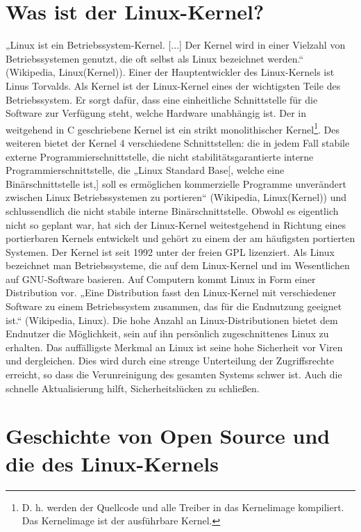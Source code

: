 \documentclass[a4paper,12pt]{article}
\begin{document}
\section{Was ist der Linux-Kernel?}%
„Linux ist ein Betriebssystem-Kernel. [...] Der Kernel wird in einer Vielzahl von Betriebssystemen genutzt, die oft selbst als Linux bezeichnet werden.“ (Wikipedia, Linux(Kernel)). Einer der Hauptentwickler des Linux-Kernels ist Linus Torvalds. Als Kernel ist der Linux-Kernel eines der wichtigsten Teile des Betriebssystem. Er sorgt dafür, dass eine einheitliche Schnittstelle für die Software zur Verfügung steht, welche Hardware unabhängig ist. Der in weitgehend in C geschriebene Kernel ist ein strikt monolithischer Kernel\footnote{D. h. werden der Quellcode und alle Treiber in das Kernelimage kompiliert. Das Kernelimage ist der ausführbare Kernel.}. Des weiteren bietet der Kernel 4 verschiedene Schnittstellen: die in jedem Fall stabile externe Programmierschnittstelle, die nicht stabilitätsgarantierte interne Programmierschnittstelle, die „Linux Standard Base[, welche eine Binärschnittstelle ist,] soll es ermöglichen kommerzielle Programme unverändert zwischen Linux Betriebssystemen zu portieren“ (Wikipedia, Linux(Kernel)) und schlussendlich die nicht stabile interne Binärschnittstelle. Obwohl es eigentlich nicht so geplant war, hat sich der Linux-Kernel weitestgehend in Richtung eines portierbaren Kernels entwickelt und gehört zu einem der am häufigsten portierten Systemen. Der Kernel ist seit 1992 unter der freien GPL lizenziert.
Als Linux bezeichnet man Betriebssysteme, die auf dem Linux-Kernel und im Wesentlichen auf GNU-Software basieren. Auf Computern kommt Linux in Form einer Distribution vor. „Eine Distribution fasst den Linux-Kernel mit verschiedener Software zu einem Betriebssystem zusammen, das für die Endnutzung geeignet ist.“ (Wikipedia, Linux). Die hohe Anzahl an Linux-Distributionen bietet dem Endnutzer die Möglichkeit, sein auf ihn persönlich zugeschnittenes Linux zu erhalten. Das auffälligste Merkmal an Linux ist seine hohe Sicherheit vor Viren und dergleichen. Dies wird durch eine strenge Unterteilung der Zugriffsrechte erreicht, so dass die Verunreinigung des gesamten Systems schwer ist. Auch die schnelle Aktualisierung hilft, Sicherheitslücken zu schließen.
\newpage
\section{Geschichte von Open Source und die des Linux-Kernels}%
\end{document}
